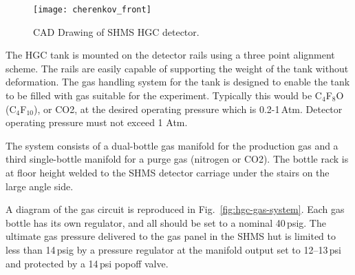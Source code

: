 {%
%
%
%
%
%
%
%



\begin{figure}[ht]
\centering
\texttt{[image: cherenkov\_front]}
\caption{CAD Drawing of SHMS HGC detector. \label{fig:hgc}}
\end{figure}

The HGC tank is mounted on the detector rails using a three point alignment
scheme. The rails are easily capable of supporting the weight of the tank
without deformation. The gas handling system for the tank is designed to enable
the tank to be filled with gas suitable for the experiment.  Typically this 
would be C$_4$F$_8$O (C$_4$F$_{10}$), or CO2, at the desired operating pressure which is
0.2-1\,Atm. Detector operating pressure must not exceed 1 Atm.

The system consists of a dual-bottle gas manifold for the production gas and a
third single-bottle manifold for a purge gas (nitrogen or CO2).  The bottle
rack is at floor height welded to the SHMS detector carriage under the stairs
on the large angle side.

A diagram of the gas circuit is reproduced in Fig.~\ref{fig:hgc-gas-system}.
Each gas bottle has its own regulator, and all should be set to a nominal
40\,psig.  The ultimate gas pressure delivered to the gas panel in the SHMS hut
is limited to less than 14\,psig by a pressure regulator at the manifold output
set to 12--13\,psi and protected by a 14\,psi popoff valve.

}
